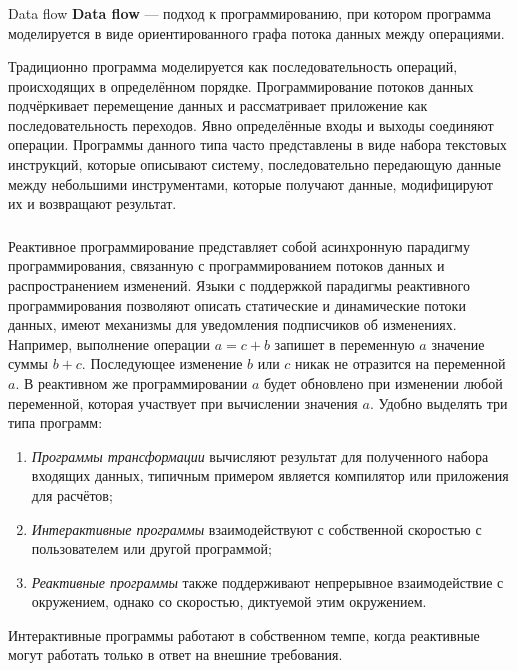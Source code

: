 \subsubsection{} Data flow
\textbf{Data flow} --- подход к программированию, при котором программа моделируется в виде ориентированного графа потока данных между операциями. \cite{wiki:data-flow} 

Традиционно программа моделируется как последовательность операций, происходящих в определённом порядке. Программирование потоков данных подчёркивает перемещение данных и рассматривает приложение как последовательность переходов. Явно определённые входы и выходы соединяют операции. Программы данного типа часто представлены в виде набора текстовых инструкций, которые описывают систему, последовательно передающую данные между небольшими инструментами, которые получают данные, модифицируют их и возвращают результат. 

\subsubsection{} Реактивное программирование
представляет собой асинхронную парадигму программирования, связанную с программированием потоков данных и распространением изменений. Языки с поддержкой парадигмы реактивного программирования позволяют описать статические и динамические потоки данных, имеют механизмы для уведомления подписчиков об изменениях. Например, выполнение операции \(a = c + b\) запишет в переменную \(a\) значение суммы \(b + c\). Последующее изменение \(b\) или \(c\) никак не отразится на переменной \(a\). В реактивном же программировании \(a\) будет обновлено при изменении любой переменной, которая участвует при вычислении значения \(a\).
Удобно выделять три типа программ:
\begin{enumerate}
	\item \emph{Программы трансформации} вычисляют результат для полученного набора входящих данных, типичным примером является компилятор или приложения для расчётов;
	\item \emph{Интерактивные программы} взаимодействуют с собственной скоростью с пользователем или другой программой;
	\item \emph{Реактивные программы} также поддерживают непрерывное взаимодействие с окружением, однако со скоростью, диктуемой этим окружением.
\end{enumerate}
Интерактивные программы работают в собственном темпе, когда реактивные могут работать только в ответ на внешние требования.